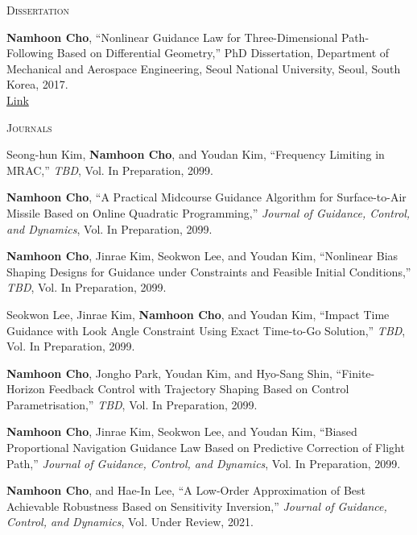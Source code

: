\textsc{Dissertation}
\vspace{0.5em}
\begin{enumerate}[label={[}\arabic*{]}]
\item \textbf{Namhoon Cho}, ``Nonlinear Guidance Law for Three-Dimensional Path-Following Based on Differential Geometry,'' PhD Dissertation, Department of Mechanical and Aerospace Engineering, Seoul National University, Seoul, South Korea, 2017. \\
 \href{https://hdl.handle.net/10371/118598}{Link}

\end{enumerate}\vspace{0.5em}
\textsc{Journals}
\vspace{0.5em}
\begin{enumerate}[itemsep=0.5em, label={[}J\arabic*{]}]
\item Seong-hun Kim, \textbf{Namhoon Cho}, and Youdan Kim, ``Frequency Limiting in MRAC,'' \textit{TBD}, Vol. In Preparation, 2099. 

\item \textbf{Namhoon Cho}, ``A Practical Midcourse Guidance Algorithm for Surface-to-Air Missile Based on Online Quadratic Programming,'' \textit{Journal of Guidance, Control, and Dynamics}, Vol. In Preparation, 2099. 

\item \textbf{Namhoon Cho}, Jinrae Kim, Seokwon Lee, and Youdan Kim, ``Nonlinear Bias Shaping Designs for Guidance under Constraints and Feasible Initial Conditions,'' \textit{TBD}, Vol. In Preparation, 2099. 

\item Seokwon Lee, Jinrae Kim, \textbf{Namhoon Cho}, and Youdan Kim, ``Impact Time Guidance with Look Angle Constraint Using Exact Time-to-Go Solution,'' \textit{TBD}, Vol. In Preparation, 2099. 

\item \textbf{Namhoon Cho}, Jongho Park, Youdan Kim, and Hyo-Sang Shin, ``Finite-Horizon Feedback Control with Trajectory Shaping Based on Control Parametrisation,'' \textit{TBD}, Vol. In Preparation, 2099. 

\item \textbf{Namhoon Cho}, Jinrae Kim, Seokwon Lee, and Youdan Kim, ``Biased Proportional Navigation Guidance Law Based on Predictive Correction of Flight Path,'' \textit{Journal of Guidance, Control, and Dynamics}, Vol. In Preparation, 2099. 

\item \textbf{Namhoon Cho}, and Hae-In Lee, ``A Low-Order Approximation of Best Achievable Robustness Based on Sensitivity Inversion,'' \textit{Journal of Guidance, Control, and Dynamics}, Vol. Under Review, 2021. 


\end{enumerate}
